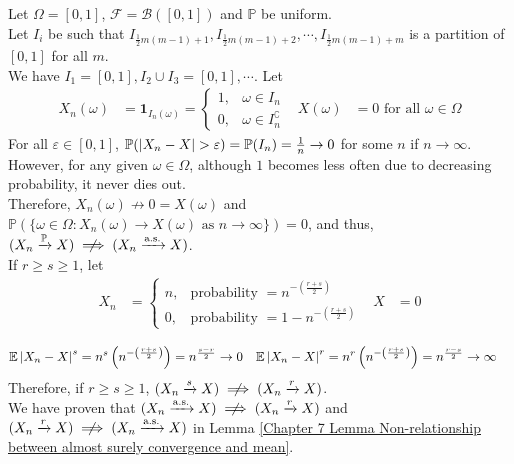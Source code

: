 \documentclass{huhtakm-template-book}
\newcommand{\prob}{\mathbb{P}}
\newcommand{\expect}{\mathbb{E}}
\begin{document}
\begin{proofing}
\begin{enumerate}
            Let $\Omega=[0,1]$, $\mathcal{F}=\mathcal{B}([0,1])$ and $\prob$ be uniform.\\
            Let $I_{i}$ be such that $I_{\frac{1}{2}m(m-1)+1}, I_{\frac{1}{2}m(m-1)+2}, \cdots, I_{\frac{1}{2}m(m-1)+m}$ is a partition of $[0,1]$ for all $m$.\\
            We have $I_{1}=[0,1], I_{2}\cup I_{3}=[0,1],\cdots$. Let
            \begin{align*}
                X_{n}(\omega)&=\mathbf{1}_{I_{n}(\omega)}=\begin{cases}
                    1, &\omega\in I_{n}\\
                    0, &\omega\in I_{n}^{\complement}
                \end{cases} & X(\omega)&=0\text{ for all }\omega\in\Omega
            \end{align*}
            For all $\varepsilon\in[0,1]$, $\prob(\abs{X_{n}-X}>\varepsilon)=\prob(I_{n})=\frac{1}{n}\to 0$ for some $n$ if $n\to\infty$.\\
            However, for any given $\omega\in\Omega$, although $1$ becomes less often due to decreasing probability, it never dies out.\\
            Therefore, $X_{n}(\omega)\not\to 0=X(\omega)$ and $\prob(\{\omega\in\Omega:X_{n}(\omega)\to X(\omega)\text{ as }n\to\infty\})=0$, and thus, $(X_{n}\xrightarrow{\prob}X)\centernot\implies(X_{n}\xrightarrow{\text{a.s.}}X)$.\\
            If $r\geq s\geq 1$, let
            \begin{align*}
                X_{n}&=\begin{cases}
                    n, &\text{probability }=n^{-\left(\frac{r+s}{2}\right)}\\
                    0, &\text{probability }=1-n^{-\left(\frac{r+s}{2}\right)}
                \end{cases} & X&=0
            \end{align*}

            \begin{align*}
                \expect\abs{X_{n}-X}^{s}&=n^{s}\left(n^{-\left(\frac{r+s}{2}\right)}\right)=n^{\frac{s-r}{2}}\to 0 & \expect\abs{X_{n}-X}^{r}&=n^{r}\left(n^{-\left(\frac{r+s}{2}\right)}\right)=n^{\frac{r-s}{2}}\to\infty
            \end{align*}
            Therefore, if $r\geq s\geq 1$, $(X_{n}\xrightarrow{s}X)\centernot\implies(X_{n}\xrightarrow{r}X)$.\\
            We have proven that $(X_{n}\xrightarrow{\text{a.s.}}X)\centernot\implies(X_{n}\xrightarrow{r}X)$ and $(X_{n}\xrightarrow{r}X)\centernot\implies(X_{n}\xrightarrow{\text{a.s.}}X)$ in Lemma \ref{Chapter 7 Lemma Non-relationship between almost surely convergence and mean}.
        \end{enumerate}
    \end{proofing}
\end{document}
